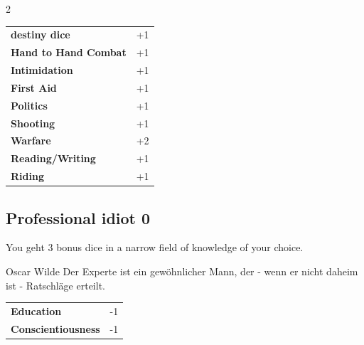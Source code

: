 \begin{multicols}{2}
\begin{tcolorbox}
\vspace{3mm}

\begin{tabular}{@{}ll@{}}
    \textbf{destiny dice} & +1\\
    \textbf{Hand to Hand Combat} & +1\\
    \textbf{Intimidation} & +1\\
    \textbf{First Aid} & +1\\
    \textbf{Politics} & +1\\
    \textbf{Shooting} & +1\\
    \textbf{Warfare} & +2\\
    \textbf{Reading/Writing} & +1\\
    \textbf{Riding} & +1\\
\end{tabular}


\end{tcolorbox}

\begin{tcolorbox}
    \subsection*{Professional idiot \hfill \small{0 }}
    \tcblower
You geht 3 bonus dice in a narrow field of knowledge of your choice.

\begin{pquote}{Oscar Wilde}
Der Experte ist ein gewöhnlicher Mann, der - wenn er nicht daheim ist - Ratschläge erteilt.
\end{pquote}

\vspace{3mm}

\begin{tabular}{@{}ll@{}}
    \textbf{Education} & -1\\
    \textbf{Conscientiousness} & -1\\
\end{tabular}


\end{tcolorbox}


\end{multicols}
